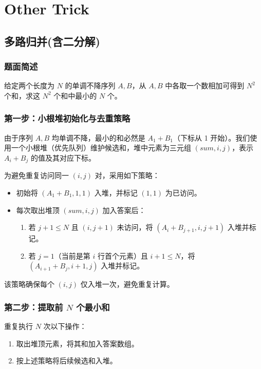 \documentclass[11pt,a4paper,twocolumn]{ctexart}  %
\begin{document}
\section{Other Trick}

\subsection{多路归并(含二分解)}
\subsubsection*{题面简述}

给定两个长度为 $N$ 的单调不降序列 $A, B$，从 $A, B$ 中各取一个数相加可得到 $N^2$ 个和，求这 $N^2$ 个和中最小的 $N$ 个。

\subsubsection*{第一步：小根堆初始化与去重策略}

由于序列 $A, B$ 均单调不降，最小的和必然是 $A_1 + B_1$（下标从 1 开始）。我们使用一个小根堆（优先队列）维护候选和，堆中元素为三元组 $(sum, i, j)$，表示 $A_i + B_j$ 的值及其对应下标。

为避免重复访问同一 $(i, j)$ 对，采用如下策略：
\begin{itemize}
    \item 初始将 $(A_1 + B_1, 1, 1)$ 入堆，并标记 $(1, 1)$ 为已访问。
    \item 每次取出堆顶 $(sum, i, j)$ 加入答案后：
    \begin{enumerate}
        \item 若 $j + 1 \leq N$ 且 $(i, j+1)$ 未访问，将 $(A_i + B_{j+1}, i, j+1)$ 入堆并标记。
        \item 若 $j = 1$（当前是第 $i$ 行首个元素）且 $i + 1 \leq N$，将 $(A_{i+1} + B_j, i+1, j)$ 入堆并标记。
    \end{enumerate}
\end{itemize}

该策略确保每个 $(i, j)$ 仅入堆一次，避免重复计算。

\subsubsection*{第二步：提取前 $N$ 个最小和}

重复执行 $N$ 次以下操作：
\begin{enumerate}
    \item 取出堆顶元素，将其和加入答案数组。
    \item 按上述策略将后续候选和入堆。
\end{enumerate}
\end{document}
